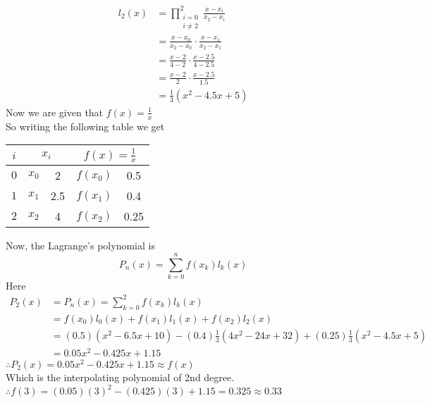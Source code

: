 \documentclass[12pt,class=book,crop=false]{standalone}
\begin{document}
\begin{soln}
    \begin{align*}
        l_2(x) & = \prod_{\substack{i=0                            \\ i\neq 2}}^2\frac{x-x_i}{x_2-x_i}\\
               & =\frac{x-x_0}{x_2-x_0}\cdot \frac{x-x_1}{x_2-x_1} \\
               & = \frac{x-2}{4-2}\cdot \frac{x-2.5}{4-2.5}        \\
               & = \frac{x-2}{2}\cdot \frac{x-2.5}{1.5}            \\
               & = \frac{1}{3}(x^2-4.5x+5)
    \end{align*}
    Now we are given that \(  f(x)=\frac{1}{x} \)\\
    So writing the following table we get\\
    \begin{center}
        \begin{tabular}{cr@{ = }Sr@{ = }S}
            \toprule
            \(i\) &  &                        \\\midrule
            \(0\) & \(  x_0\)                      & 2                                           & \(  f(x_0)\) & 0.5  \\
            \(1\) & \(  x_1\)                      & 2.5                                         & \(  f(x_1)\) & 0.4  \\
            \(2\) & \(  x_2\)                      & 4                                           & \(  f(x_2)\) & 0.25 \\\bottomrule
        \end{tabular}
    \end{center}
    Now, the Lagrange's polynomial is
    \[P_n(x)=\sum_{k=0}^nf(x_k)l_k(x)\]
    Here
    \begin{align*}
        P_2(x) & =P_n(x)=\sum_{k=0}^2f(x_k)l_k(x)                                                 \\
               & =f(x_0)l_0(x)+f(x_1)l_1(x)+f(x_2)l_2(x)                                          \\
               & = (0.5)(x^2-6.5x+10)-(0.4)\frac{1}{3}(4x^2-24x+32)+(0.25)\frac{1}{3}(x^2-4.5x+5) \\
               & =0.05x^2-0.425x+1.15
    \end{align*}
    \(  \therefore P_2(x)=0.05x^2-0.425x+1.15\approx f(x) \)\\
    Which is the interpolating polynomial of 2nd degree.\\
    \(  \therefore f(3)=(0.05)(3)^2-(0.425)(3)+1.15=0.325\approx 0.33 \)\\
\end{soln}
\end{document}
